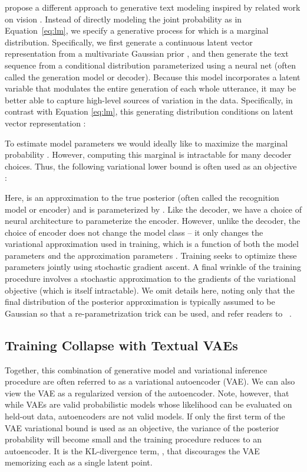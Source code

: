 \documentclass{article}
\begin{document}
\citet{bowman2015generating} propose a different approach to generative text modeling inspired by related work on vision \cite{kingma2013auto}. Instead of directly modeling the joint probability 
as in Equation~\ref{eq:lm}, we specify a generative process for which  is a marginal distribution. Specifically, we first generate a continuous latent vector representation  from a multivariate Gaussian prior , and then generate the text sequence 
from a conditional distribution  parameterized using a neural net (often called the generation model or decoder). Because this model incorporates a latent variable that modulates the entire generation of each whole utterance, it may be better able to capture high-level sources of variation in the data. Specifically, in contrast with Equation \ref{eq:lm}, this generating distribution conditions
on latent vector representation :


To estimate model parameters  we
would ideally like to maximize the marginal probability
.
However, computing this marginal is intractable for many decoder choices. Thus, the following variational lower bound is often used as an objective \cite{kingma2013auto}:

Here,  is an approximation to the true posterior (often called the recognition model or encoder) and is parameterized by . Like the decoder, we have a choice of neural architecture to parameterize the encoder. However, unlike the decoder, the choice of encoder does not change the model class -- it only changes the variational approximation used in training, which is a function of both the model parameters  {\emph and} the approximation parameters . Training seeks to optimize these parameters jointly using stochastic gradient ascent. A final wrinkle of the training procedure involves a stochastic approximation to the gradients of the variational objective (which is itself intractable). We omit details here, noting only that the final distribution of the posterior approximation  is typically assumed to be Gaussian so that a
re-parametrization trick can be used, and refer readers to ~\cite{kingma2013auto}.

\subsection{Training Collapse with Textual VAEs}

Together, this combination of generative model and variational inference procedure are often referred to as a variational autoencoder (VAE).
We can also view the VAE as a regularized version of the autoencoder. Note, however, that while VAEs are valid probabilistic models whose likelihood can be evaluated on held-out data, autoencoders are not valid models. If only the first
term of the VAE variational bound  is used as an objective,
the variance of the posterior probability 
will become small and the training procedure reduces to an autoencoder.
It is the KL-divergence term,
, that discourages the VAE memorizing each  as a single
latent point.
\end{document}
